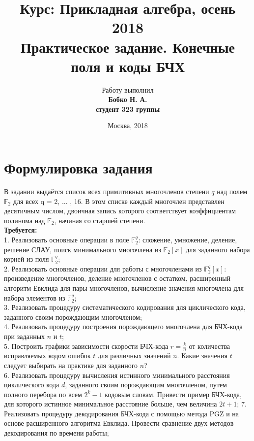 \documentclass[12pt]{article}
\title{\textbf{Курс: Прикладная алгебра, осень 2018 \\
Практическое задание. Конечные поля и коды БЧХ \\}}
\author{Работу выполнил\\
\textbf{Бобко Н. А.} \\
\textbf{студент 323 группы}}
\date{Москва, 2018}
\newcommand{\F}{\mathbb{F}_2}
\newcommand{\Fq}{\mathbb{F}_2^q}
\begin{document}
    \maketitle
    \newpage

    \tableofcontents
    \newpage

    \section{Формулировка задания}
        В задании выдаётся список всех примитивных многочленов степени $q$ над полем $\F$ для всех q = 2, ... , 16.
        В этом списке каждый многочлен представлен десятичным числом, двоичная запись которого соответствует
        коэффициентам полинома над $\F$, начиная со старшей степени.\\

        \textbf{Требуется:}\\
        1. Реализовать основные операции в поле $\Fq$: сложение, умножение, деление, решение СЛАУ, поиск 
        минимального многочлена из $\F[x]$ для заданного набора корней из поля $\Fq$; \\
        2. Реализовать основные операции для работы с многочленами из $\Fq[x]$: произведение многочленов, 
        деление многочленов с остатком, расширенный алгоритм Евклида для пары многочленов, вычисление 
        значения многочлена для набора элементов из $\Fq$; \\
        3. Реализовать процедуру систематического кодирования для циклического кода, заданного своим 
        порождающим многочленом; \\
        4. Реализовать процедуру построения порождающего многочлена для БЧХ-кода при заданных $n$ и 
        $t$; \\
        5. Построить графики зависимости скорости БЧХ-кода $r=\frac{k}{n}$ от количества исправляемых 
        кодом ошибок $t$ для различных значений $n$. Какие значения $t$ следует выбирать на практике
        для заданного $n$? \\
        6. Реализовать процедуру вычисления истинного минимального расстояния циклического кода $d$, заданного
        своим порождающим многочленом, путем полного перебора по всем $2^k - 1$ кодовым словам. Привести
        пример БЧХ-кода, для которого истинное минимальное расстояние больше, чем величина $2t + 1$;
        7. Реализовать процедуру декодирования БЧХ-кода с помощью метода PGZ и на основе расширенного 
        алгоритма Евклида. Провести сравнение двух методов декодирования по времени работы;
\end{document}
